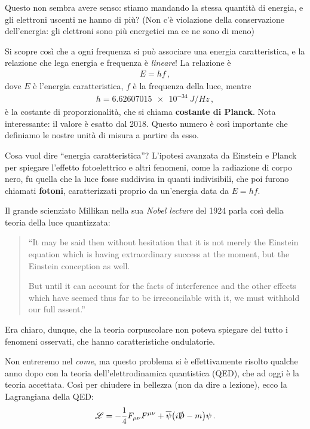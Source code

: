\documentclass{article}
\begin{document}
Questo non sembra avere senso: stiamo mandando la stessa quantità di energia, e gli elettroni uscenti ne hanno di più? 
(Non c'è violazione della conservazione dell'energia: gli elettroni sono più energetici ma ce ne sono di meno)

Si scopre così che a ogni frequenza si può associare una energia caratteristica, e la relazione che lega energia e frequenza è \emph{lineare}! La relazione è 
%
\begin{align}
E = h f
\,,
\end{align}
%
dove \(E\) è l'energia caratteristica, \(f\) è la frequenza della luce, mentre 
%
\begin{align}
h = \SI{6.62607015e-34}{J / Hz}
\,,
\end{align}
%
è la costante di proporzionalità, che si chiama \textbf{costante di Planck}. 
Nota interessante: il valore è esatto dal 2018. Questo numero è così importante che definiamo le nostre unità di misura a partire da esso.

Cosa vuol dire ``energia caratteristica''? 
L'ipotesi avanzata da Einstein e Planck per spiegare l'effetto fotoelettrico e altri fenomeni, come la radiazione di corpo nero, fu quella che la luce fosse suddivisa in quanti indivisibili, che poi furono chiamati \textbf{fotoni}, caratterizzati proprio da un'energia data da \(E = hf\). 

Il grande scienziato Millikan nella sua \emph{Nobel lecture} del 1924
\autocite[]{millikanRobertMillikanNobel1924} parla così della teoria della luce quantizzata: 

\begin{quotation}
``It may be said then without hesitation that it
is not merely the Einstein equation which is having extraordinary success at
the moment, but the Einstein conception as well.

But until it can account for the facts of interference and the other effects
which have seemed thus far to be irreconcilable with it, we must withhold
our full assent.''
\end{quotation}

Era chiaro, dunque, che la teoria corpuscolare non poteva spiegare del tutto i fenomeni osservati, che hanno caratteristiche ondulatorie.

Non entreremo nel \emph{come}, ma questo problema si è effettivamente risolto qualche anno dopo con la teoria dell'elettrodinamica quantistica (QED), che ad oggi è la teoria accettata. 
Così per chiudere in bellezza (non da dire a lezione), ecco la Lagrangiana della QED:
%
\begin{align}
\mathscr{L} = - \frac{1}{4}  F_{\mu \nu } F^{\mu \nu }
+ \overline{\psi} \qty(i \slashed{\DD} -m ) \psi 
\,.
\end{align}
\end{document}
